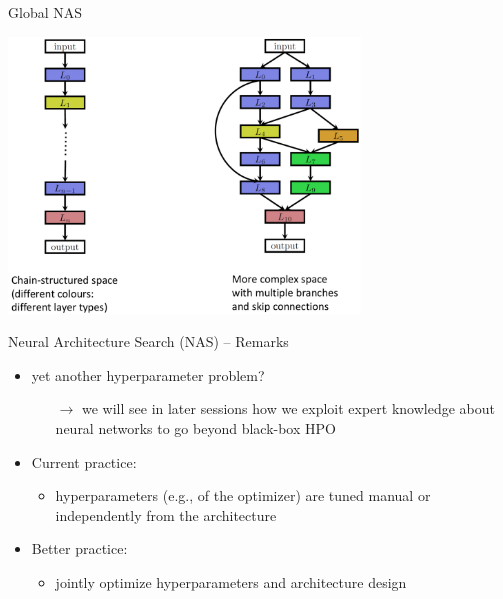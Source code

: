 \begin{frame}[c]{Global NAS}

\centering
\includegraphics[width=0.7\textwidth]{images/nas_global.png}

\end{frame}
\begin{frame}[c]{Neural Architecture Search (NAS) -- Remarks}

\begin{itemize}
  \item yet another hyperparameter problem?
  \begin{itemize}
    \item[$\to$] we will see in later sessions how we exploit expert knowledge about neural networks to go beyond black-box HPO
  \end{itemize}
  \pause
  \bigskip
  \item Current practice: 
  \begin{itemize}
    \item hyperparameters (e.g., of the optimizer) are tuned manual or independently from the architecture
  \end{itemize}
  \pause
  \item Better practice:
  \begin{itemize}
    \item jointly optimize hyperparameters and architecture design\\ 
  \end{itemize}
\end{itemize}

\end{frame}
